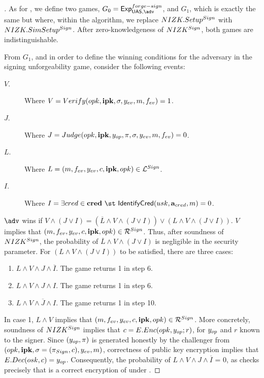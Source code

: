 \begin{proof}[]
  As for , we define two games, $G_0=\ExpForgeSign$,
  and $G_1$, which is exactly the same but where, within the \Setup algorithm,
  we replace $NIZK.Setup^{Sign}$ with $NIZK.SimSetup^{Sign}$. After
  zero-knowledgeness of $NIZK^{Sign}$, both games are indistinguishable.

  From $G_1$, and in order to define the winning conditions for the adversary
  in the signing unforgeability game, consider the following events:

  \begin{description}
  \item[$V$.] Where $V = Verify(opk,\mathbf{ipk},\sigma,y_{ev},m,f_{ev}) = 1$.
  \item[$J$.] Where $J = Judge(opk,\mathbf{ipk},y_{op},\pi,\sigma,y_{ev},m,
    f_{ev}) = 0$.
  \item[$L$.] Where $L = (m,f_{ev},y_{ev},c,\mathbf{ipk},opk) \in
    \mathcal{L}^{Sign}$.    
  \item[$I$.] Where $I = \exists \cred \in \scred~\st~\IdentifyCred(\usk,
    \attrs_{\cred},\msg) = 0$.
  \end{description}

  $\adv$ wins if $V \land (J \lor I) = (\overline{L} \land V \land (J \lor I))
  \lor (L \land V \land (J \lor I))$.
  $V$ implies that $(m,f_{ev},y_{ev},c,\mathbf{ipk},opk) \in \mathcal{R}^{Sign}$.
  Thus, after soundness of $NIZK^{Sign}$, the probability of $\overline{L}
  \land V \land (J \lor I)$ is negligible in the security parameter.
  For $(L \land V \land (J \lor I))$ to be satisfied, there are three cases:
  \begin{enumerate}
  \item $L \land V \land J \land \overline{I}$. The game returns 1 in step 6.
  \item $L \land V \land J \land I$.  The game returns 1 in step 6.
  \item $L \land V \land \overline{J} \land I$. The game returns 1 in step 10. 
  \end{enumerate}

  In case 1, $L \land V$ implies that $(m,f_{ev},y_{ev},c,\mathbf{ipk},opk) \in
  \mathcal{R}^{Sign}$. More concretely, soundness of $NIZK^{Sign}$ implies that
  $c = E.Enc(opk,y_{op};r)$, for $y_{op}$ and $r$ known to the signer. Since
  $(y_{op},\pi)$ is generated honestly by the challenger from
  $(opk,\mathbf{ipk},\sigma = (\pi_{Sign},c),y_{ev},m)$, correctness of
  public key encryption implies that $E.Dec(osk,c) = y_{op}$. Consequently,
  the probability of $L \land V \land J \land \overline{I}$ = 0, as \Judge
  checks precisely that \Ec is a correct encryption of \yinsp under \opk.


\end{proof}
